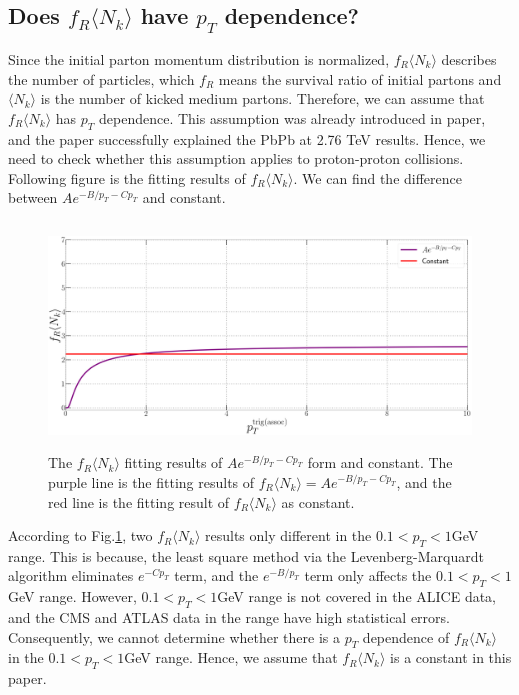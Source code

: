 \documentclass[jkps,fleqn,showpacs,showkeys]{revtex4}
\begin{document}
\subsection{Does $f_R\langle N_k \rangle$ have $p_T$ dependence?}
\label{subsec: pT depnedence}

Since the initial parton momentum distribution is normalized, $f_R\langle N_k \rangle$ describes the number of particles, which $f_R$ means the survival ratio of initial partons and $\langle N_k \rangle$ is the number of kicked medium partons.
Therefore, we can assume that $f_R\langle N_k \rangle$ has $p_T$ dependence.
This assumption was already introduced in paper\cite{PbPb}, and the paper successfully explained the PbPb at 2.76 TeV results.
Hence, we need to check whether this assumption applies to proton-proton collisions.
Following figure is the fitting results of $f_R\langle N_k \rangle$.
We can find the difference between $Ae^{-{B} / p_T -C p_{T}}$ and constant.

\begin{figure}[ht]
\centering
\includegraphics[width=12cm, height=6cm]{./Figures/ptVSnone}
\caption{The $f_R\langle N_k \rangle$ fitting results of $Ae^{-{B} / p_T -C p_{T}}$ form and constant. The purple line is the fitting results of $f_R\langle N_k \rangle = Ae^{-{B} / p_T -C p_{T}}$, and the red line is the fitting result of $f_R\langle N_k \rangle$ as constant. }
\label{figure:ptVSnone}
\end{figure}

According to Fig.\ref{figure:ptVSnone}, two $f_R \langle N_k \rangle$ results only different in the $0.1<p_T<1$GeV range.
This is because, the least square method via the Levenberg-Marquardt algorithm eliminates $e^{-Cp_T}$ term, and the $e^{-B/p_T}$ term only affects the $0.1<p_T<1$GeV range.
However, $0.1<p_T<1$GeV range is not covered in the ALICE data, and the CMS and ATLAS data in the range have high statistical errors.
Consequently, we cannot determine whether there is a $p_T$ dependence of $f_R\langle N_k \rangle$ in the $0.1<p_T<1$GeV range.
Hence, we assume that $f_R\langle N_k \rangle$ is a constant in this paper.
\end{document}
